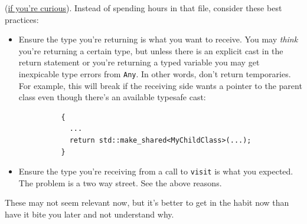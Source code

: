 \documentclass{article}
\newcommand{\code}[1]{\texttt{\textmd{#1}}}
\begin{document}
\begin{itemize}
    (\href{https://github.com/antlr/antlr4/blob/master/runtime/Cpp/runtime/src/support/Any.h} {if
    you're curious}). Instead of spending hours in that file, consider these best practices:
    \begin{itemize}
      \item
        Ensure the type you're returning is what you want to receive. You may \textit{think} you're
        returning a certain type, but unless there is an explicit cast in the return statement or
        you're returning a typed variable you may get inexpicable type errors from \code{Any}. In
        other words, don't return temporaries. For example, this will break if the receiving side
        wants a pointer to the parent class even though there's an available typesafe cast:
        \begin{lstlisting}
          {
            ...
            return std::make_shared<MyChildClass>(...);
          }
        \end{lstlisting}
      \item
        Ensure the type you're receiving from a call to \code{visit} is what you expected. The
        problem is a two way street. See the above reasons.
    \end{itemize}
    These may not seem relevant now, but it's better to get in the habit now than have it bite you
    later and not understand why.
\end{itemize}
\end{document}
